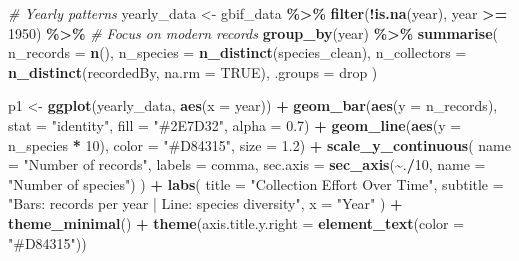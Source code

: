\documentclass[
]{article}
\newenvironment{Shaded}{\begin{snugshade}}{\end{snugshade}}
\newcommand{\AttributeTok}[1]{\textcolor[rgb]{0.13,0.29,0.53}{#1}}
\newcommand{\CommentTok}[1]{\textcolor[rgb]{0.56,0.35,0.01}{\textit{#1}}}
\newcommand{\ConstantTok}[1]{\textcolor[rgb]{0.56,0.35,0.01}{#1}}
\newcommand{\DecValTok}[1]{\textcolor[rgb]{0.00,0.00,0.81}{#1}}
\newcommand{\FloatTok}[1]{\textcolor[rgb]{0.00,0.00,0.81}{#1}}
\newcommand{\FunctionTok}[1]{\textcolor[rgb]{0.13,0.29,0.53}{\textbf{#1}}}
\newcommand{\NormalTok}[1]{#1}
\newcommand{\OtherTok}[1]{\textcolor[rgb]{0.56,0.35,0.01}{#1}}
\newcommand{\SpecialCharTok}[1]{\textcolor[rgb]{0.81,0.36,0.00}{\textbf{#1}}}
\newcommand{\StringTok}[1]{\textcolor[rgb]{0.31,0.60,0.02}{#1}}
\begin{document}
\begin{Shaded}
\begin{Highlighting}[]
\CommentTok{\# Yearly patterns}
\NormalTok{yearly\_data }\OtherTok{\textless{}{-}}\NormalTok{ gbif\_data }\SpecialCharTok{\%\textgreater{}\%}
  \FunctionTok{filter}\NormalTok{(}\SpecialCharTok{!}\FunctionTok{is.na}\NormalTok{(year), year }\SpecialCharTok{\textgreater{}=} \DecValTok{1950}\NormalTok{) }\SpecialCharTok{\%\textgreater{}\%}  \CommentTok{\# Focus on modern records}
  \FunctionTok{group\_by}\NormalTok{(year) }\SpecialCharTok{\%\textgreater{}\%}
  \FunctionTok{summarise}\NormalTok{(}
    \AttributeTok{n\_records =} \FunctionTok{n}\NormalTok{(),}
    \AttributeTok{n\_species =} \FunctionTok{n\_distinct}\NormalTok{(species\_clean),}
    \AttributeTok{n\_collectors =} \FunctionTok{n\_distinct}\NormalTok{(recordedBy, }\AttributeTok{na.rm =} \ConstantTok{TRUE}\NormalTok{),}
    \AttributeTok{.groups =} \StringTok{\textquotesingle{}drop\textquotesingle{}}
\NormalTok{  )}

\NormalTok{p1 }\OtherTok{\textless{}{-}} \FunctionTok{ggplot}\NormalTok{(yearly\_data, }\FunctionTok{aes}\NormalTok{(}\AttributeTok{x =}\NormalTok{ year)) }\SpecialCharTok{+}
  \FunctionTok{geom\_bar}\NormalTok{(}\FunctionTok{aes}\NormalTok{(}\AttributeTok{y =}\NormalTok{ n\_records), }\AttributeTok{stat =} \StringTok{"identity"}\NormalTok{, }\AttributeTok{fill =} \StringTok{"\#2E7D32"}\NormalTok{, }\AttributeTok{alpha =} \FloatTok{0.7}\NormalTok{) }\SpecialCharTok{+}
  \FunctionTok{geom\_line}\NormalTok{(}\FunctionTok{aes}\NormalTok{(}\AttributeTok{y =}\NormalTok{ n\_species }\SpecialCharTok{*} \DecValTok{10}\NormalTok{), }\AttributeTok{color =} \StringTok{"\#D84315"}\NormalTok{, }\AttributeTok{size =} \FloatTok{1.2}\NormalTok{) }\SpecialCharTok{+}
  \FunctionTok{scale\_y\_continuous}\NormalTok{(}
    \AttributeTok{name =} \StringTok{"Number of records"}\NormalTok{,}
    \AttributeTok{labels =}\NormalTok{ comma,}
    \AttributeTok{sec.axis =} \FunctionTok{sec\_axis}\NormalTok{(}\SpecialCharTok{\textasciitilde{}}\NormalTok{.}\SpecialCharTok{/}\DecValTok{10}\NormalTok{, }\AttributeTok{name =} \StringTok{"Number of species"}\NormalTok{)}
\NormalTok{  ) }\SpecialCharTok{+}
  \FunctionTok{labs}\NormalTok{(}
    \AttributeTok{title =} \StringTok{"Collection Effort Over Time"}\NormalTok{,}
    \AttributeTok{subtitle =} \StringTok{"Bars: records per year | Line: species diversity"}\NormalTok{,}
    \AttributeTok{x =} \StringTok{"Year"}
\NormalTok{  ) }\SpecialCharTok{+}
  \FunctionTok{theme\_minimal}\NormalTok{() }\SpecialCharTok{+}
  \FunctionTok{theme}\NormalTok{(}\AttributeTok{axis.title.y.right =} \FunctionTok{element\_text}\NormalTok{(}\AttributeTok{color =} \StringTok{"\#D84315"}\NormalTok{))}


\end{Highlighting}
\end{Shaded}
\end{document}
